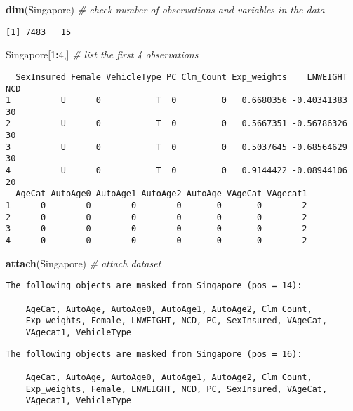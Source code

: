 \documentclass[]{book}
\newenvironment{Shaded}{\begin{snugshade}}{\end{snugshade}}
\newcommand{\KeywordTok}[1]{\textcolor[rgb]{0.13,0.29,0.53}{\textbf{#1}}}
\newcommand{\DecValTok}[1]{\textcolor[rgb]{0.00,0.00,0.81}{#1}}
\newcommand{\CommentTok}[1]{\textcolor[rgb]{0.56,0.35,0.01}{\textit{#1}}}
\newcommand{\OperatorTok}[1]{\textcolor[rgb]{0.81,0.36,0.00}{\textbf{#1}}}
\newcommand{\NormalTok}[1]{#1}
\theoremstyle{definition}
\theoremstyle{definition}
\theoremstyle{definition}
\theoremstyle{remark}
\begin{document}
\begin{Shaded}
\begin{Highlighting}[]
\KeywordTok{dim}\NormalTok{(Singapore)  }\CommentTok{# check number of observations and variables in the data}
\end{Highlighting}
\end{Shaded}

\begin{verbatim}
[1] 7483   15
\end{verbatim}

\begin{Shaded}
\begin{Highlighting}[]
\NormalTok{Singapore[}\DecValTok{1}\OperatorTok{:}\DecValTok{4}\NormalTok{,]  }\CommentTok{# list the first 4 observations}
\end{Highlighting}
\end{Shaded}

\begin{verbatim}
  SexInsured Female VehicleType PC Clm_Count Exp_weights    LNWEIGHT NCD
1          U      0           T  0         0   0.6680356 -0.40341383  30
2          U      0           T  0         0   0.5667351 -0.56786326  30
3          U      0           T  0         0   0.5037645 -0.68564629  30
4          U      0           T  0         0   0.9144422 -0.08944106  20
  AgeCat AutoAge0 AutoAge1 AutoAge2 AutoAge VAgeCat VAgecat1
1      0        0        0        0       0       0        2
2      0        0        0        0       0       0        2
3      0        0        0        0       0       0        2
4      0        0        0        0       0       0        2
\end{verbatim}

\begin{Shaded}
\begin{Highlighting}[]
\KeywordTok{attach}\NormalTok{(Singapore)  }\CommentTok{# attach dataset}
\end{Highlighting}
\end{Shaded}

\begin{verbatim}
The following objects are masked from Singapore (pos = 14):

    AgeCat, AutoAge, AutoAge0, AutoAge1, AutoAge2, Clm_Count,
    Exp_weights, Female, LNWEIGHT, NCD, PC, SexInsured, VAgeCat,
    VAgecat1, VehicleType
\end{verbatim}

\begin{verbatim}
The following objects are masked from Singapore (pos = 16):

    AgeCat, AutoAge, AutoAge0, AutoAge1, AutoAge2, Clm_Count,
    Exp_weights, Female, LNWEIGHT, NCD, PC, SexInsured, VAgeCat,
    VAgecat1, VehicleType
\end{verbatim}
\end{document}
